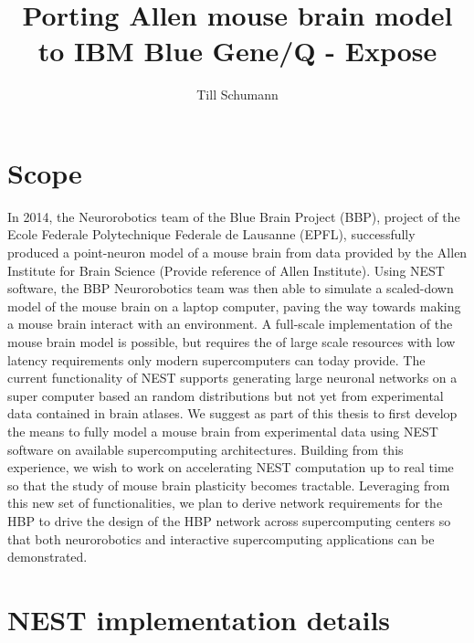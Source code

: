 \documentclass[a4paper]{article}
\title{Porting Allen mouse brain model to IBM Blue Gene/Q - Expose}
\author{Till Schumann}
\begin{document}
   \maketitle


\section{Scope}
In 2014, the Neurorobotics team of the Blue Brain Project (BBP), project of the Ecole Federale Polytechnique Federale de Lausanne (EPFL), successfully produced a point-neuron model
of a mouse brain from data provided by the Allen Institute for Brain Science (Provide reference of Allen Institute).
Using NEST software, the BBP Neurorobotics team was then able to simulate a
scaled-down model of the mouse brain on a laptop computer, paving the way towards
making a mouse brain interact with an environment. A full-scale implementation of
the mouse brain model is possible, but requires the of large scale resources with low latency requirements only modern supercomputers can today provide.
The current functionality of NEST supports  generating large neuronal networks
on a super computer based an random distributions but not yet from experimental data contained in brain atlases. 
We suggest as part of this thesis to first develop the means to fully model a mouse brain from experimental data using NEST software on available supercomputing architectures.
Building from this experience, we wish to work on accelerating NEST computation up to real time so that the study of mouse brain plasticity becomes
tractable. Leveraging from this new set of functionalities, we plan to derive network requirements for the HBP to drive the design
of the HBP network across supercomputing centers so that both neurorobotics and interactive supercomputing applications can be demonstrated.    

\section{NEST implementation details}
\end{document}
